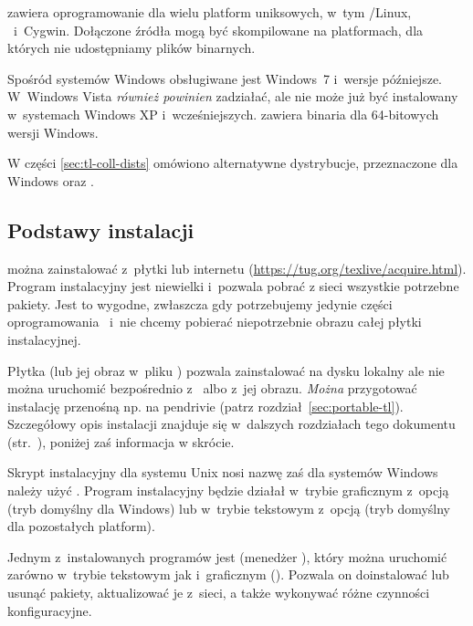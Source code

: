 \documentclass{article}
\begin{document}
\TL{} zawiera oprogramowanie dla wielu platform uniksowych,
w~tym \GNU/Linux, \macOS\  i~Cyg\-win. Dołączone źródła mogą być skompilowane
na platformach, dla których nie udostępniamy plików binarnych. %

Spośród systemów Windows obsługiwane jest Windows~7 i~wersje
późniejsze. W~Windows Vista  \emph{również powinien}
zadziałać, ale \TL{} nie może już być instalowany w~systemach Windows XP i~wcześniejszych.
\TL{}   zawiera   binaria dla 64-bitowych wersji Windows. %

W części \ref{sec:tl-coll-dists} omówiono alternatywne dystrybucje,
przeznaczone dla Windows oraz \macOS.

\subsection{Podstawy instalacji \protect\TL{}}
\label{sec:basic}

\TL{} można zainstalować z~płytki \DVD{} lub internetu
(\url{https://tug.org/texlive/acquire.html}). Program instalacyjny
jest niewielki i~pozwala pobrać z sieci wszystkie potrzebne pakiety.
Jest to wygodne, zwłaszcza gdy potrzebujemy jedynie części oprogramowania
\TL\ i~nie chcemy pobierać niepotrzebnie obrazu całej płytki instalacyjnej.

Płytka \DVD{}  (lub jej obraz w~pliku )  pozwala
zainstalować \TL{} na dysku lokalny ale nie można  uruchomić \TL{} bezpośrednio z~\TK{} \DVD{} albo z~jej obrazu.  \emph{Można}  przygotować instalację przenośną  np. na pendrivie
(patrz rozdział~\ref{sec:portable-tl}).
Szczegółowy opis instalacji \TL{} znajduje się w~dalszych rozdziałach
tego dokumentu (str.~\pageref{sec:install}), poniżej zaś informacja w skrócie.
\begin{itemize*}
\item Skrypt instalacyjny dla systemu Unix nosi nazwę  zaś dla systemów Windows
należy użyć . Program instalacyjny będzie działał w~trybie graficznym
z~opcją  (tryb domyślny dla Windows) lub w~trybie tekstowym z~opcją
 (tryb domyślny dla pozostałych platform).

\item Jednym z~instalowanych programów jest  (menedżer \TL{}),
który  można uruchomić zarówno w~trybie tekstowym jak i~graficznym (\GUI{}). Pozwala
on doinstalować lub usunąć pakiety, aktualizować je z~sieci, a także
wykonywać różne czynności konfiguracyjne.

\end{itemize*}
\end{document}
